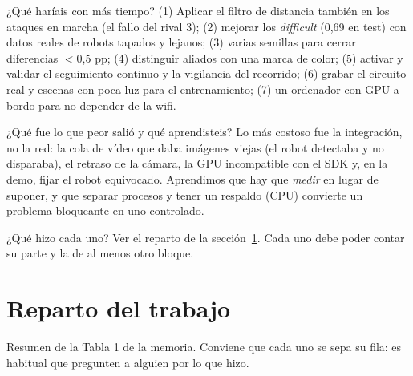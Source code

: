 \documentclass[11pt,a4paper]{article}
\begin{document}
\begin{pregunta}{¿Qué haríais con más tiempo?}
(1) Aplicar el filtro de distancia también en los ataques en marcha (el fallo del rival 3); (2) mejorar los \emph{difficult} (0,69 en test) con datos reales de robots tapados y lejanos; (3) varias semillas para cerrar diferencias $<$0,5 pp; (4) distinguir aliados con una marca de color; (5) activar y validar el seguimiento continuo y la vigilancia del recorrido; (6) grabar el circuito real y escenas con poca luz para el entrenamiento; (7) un ordenador con GPU a bordo para no depender de la wifi.
\end{pregunta}

\begin{pregunta}{¿Qué fue lo que peor salió y qué aprendisteis?}
Lo más costoso fue la integración, no la red: la cola de vídeo que daba imágenes viejas (el robot detectaba y no disparaba), el retraso de la cámara, la GPU incompatible con el SDK y, en la demo, fijar el robot equivocado. Aprendimos que hay que \emph{medir} en lugar de suponer, y que separar procesos y tener un respaldo (CPU) convierte un problema bloqueante en uno controlado.
\end{pregunta}

\begin{pregunta}{¿Qué hizo cada uno?}
Ver el reparto de la sección~\ref{sec:reparto}. Cada uno debe poder contar su parte y la de al menos otro bloque.
\end{pregunta}

\newpage
\section{Reparto del trabajo}\label{sec:reparto}
Resumen de la Tabla 1 de la memoria. Conviene que cada uno se sepa su fila: es habitual que pregunten a alguien por lo que hizo.
\end{document}
